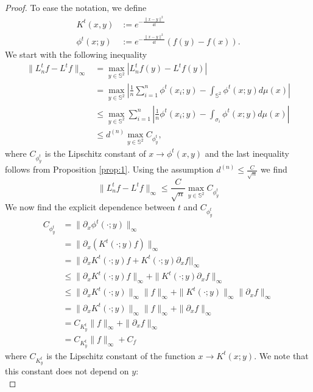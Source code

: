 \documentclass{article} %
\renewcommand{\S}{\mathbb{S}}
\begin{document}
\begin{proof}
To ease the notation, we define
\begin{align}
	K^t(x,y) &:=  e^{-\frac{\|x-y\|^2}{4t}}\\
	\phi^t(x;y) &:= e^{-\frac{\|x-y\|^2}{4t}}\left(f(y)-f(x)\right).
\end{align}
We start with the following inequality
\begin{align}
	\|L_n^tf-L^tf\|_\infty &= \max _{y\in \S^2} \left|L_n^tf(y)-L^tf(y)\right| \nonumber\\
	&= \max _{y\in \S^2} \left| \frac{1}{n} \sum_{i=1}^n \phi^t(x_i; y)- \int_{\S^2} \phi^t(x;y)d\mu(x) \right| \nonumber\\
	&\leq \max _{y\in \S^2}  \sum_{i=1}^n   \left| \frac{1}{n}  \phi^t(x_i; y)- \int_{\sigma_i} \phi^t(x;y)d\mu(x) \right| \nonumber\\
	&\leq  d^{(n)} \max _{y\in \S^2} C_{\phi^t_y} , \label{eq:prop3-base-ineq}
\end{align}
where $C_{\phi^t_y}$ is the Lipschitz constant of $x \rightarrow \phi^t(x, y)$ and the last inequality follows from Proposition \ref{prop:1}. 
Using the assumption $d^{(n)}\leq \frac{C}{\sqrt{n}}$ we find
\begin{equation*}
\|L_n^tf-L^tf\|_\infty  \leq  \frac{C}{\sqrt{n}} \max _{y\in \S^2}  C_{\phi^t_y}  
\end{equation*}
We now find the explicit dependence between $t$ and $C_{\phi^t_y}$
\begin{align*}
	C_{\phi^t_y} &= \|\partial_x\phi^t(\cdot;y)\|_\infty\\&
	= \|\partial_x\left(K^t(\cdot;y)f\right)\|_\infty\\&
	= \|\partial_x K^t(\cdot;y)f + K^t(\cdot;y)\partial_x f||_\infty\\&
	\leq \|\partial_x K^t(\cdot;y)f\|_\infty + \|K^t(\cdot;y)\partial_x f\|_\infty\\&
	\leq  \|\partial_x K^t(\cdot;y)\|_\infty\|f\|_\infty + \|K^t(\cdot;y)\|_\infty\|\partial_x f\|_\infty\\&
	= \|\partial_x K^t(\cdot;y)\|_\infty\|f\|_\infty + \|\partial_x f\|_\infty\\&
	= C_{K^t_y} \|f\|_\infty + \|\partial_xf\|_\infty\\&
	= C_{K^t_y} \|f\|_\infty + C_f
\end{align*}
where $C_{K^t_y}$ is the Lipschitz constant of the function $x\rightarrow K^t(x;y)$. We note that this constant does not depend on $y$:
\begin{equation*}

\end{equation*}
\end{proof}
\end{document}
